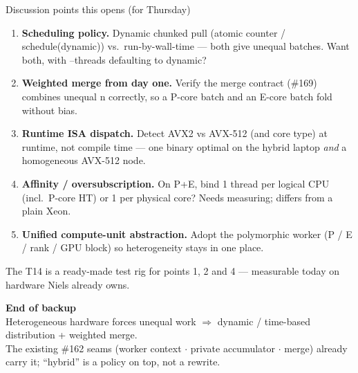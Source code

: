 \documentclass[aspectratio=169,10pt]{beamer}
\newcommand{\code}[1]{{\ttfamily\footnotesize #1}}
\begin{document}
\begin{frame}{Discussion points this opens (for Thursday)}
  \small
  \begin{enumerate}\itemsep3pt
    \item \textbf{Scheduling policy.} Dynamic chunked pull (atomic counter /
          \code{schedule(dynamic)}) vs.\ run-by-wall-time — both give unequal
          batches. Want both, with \code{--threads} defaulting to dynamic?
    \item \textbf{Weighted merge from day one.} Verify the merge contract
          (\#169) combines unequal \code{n} correctly, so a P-core batch and an
          E-core batch fold without bias.
    \item \textbf{Runtime ISA dispatch.} Detect AVX2 vs AVX-512 (and core type)
          at runtime, not compile time — one binary optimal on the hybrid
          laptop \emph{and} a homogeneous AVX-512 node.
    \item \textbf{Affinity / oversubscription.} On P+E, bind 1 thread per
          logical CPU (incl.\ P-core HT) or 1 per physical core? Needs
          measuring; differs from a plain Xeon.
    \item \textbf{Unified compute-unit abstraction.} Adopt the polymorphic
          worker (P / E / rank / GPU block) so heterogeneity stays in one
          place.
  \end{enumerate}
  \vspace{2mm}
  \footnotesize\color{oshGrey}
  The T14 is a ready-made test rig for points 1, 2 and 4 — measurable today on
  hardware Niels already owns.
\end{frame}

\begin{frame}[plain]
  \centering
  \vfill
  {\Large\color{oshBlue}\textbf{End of backup}}\\[2mm]
  \small\color{oshGrey}
  Heterogeneous hardware forces unequal work $\Rightarrow$ dynamic / time-based
  distribution + weighted merge.\\
  The existing \#162 seams (worker context $\cdot$ private accumulator $\cdot$
  merge) already carry it; ``hybrid'' is a policy on top, not a rewrite.
  \vfill
\end{frame}
\end{document}
